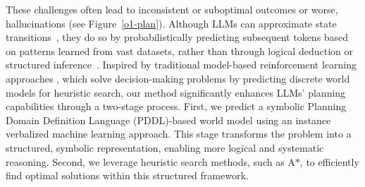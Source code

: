These challenges often lead to inconsistent or suboptimal outcomes or worse, hallucinations (see Figure~\ref{o1-plan}).
Although LLMs can approximate state transitions~\cite{hao2023reasoning}, they do so by probabilistically predicting subsequent tokens based on patterns learned from vast datasets, rather than through logical deduction or structured inference~\cite{kambhampati2024can}.
Inspired by traditional model-based reinforcement learning approaches \cite{agostinellilearning}, which solve decision-making problems by predicting discrete world models for heuristic search, our method significantly enhances LLMs' planning capabilities through a two-stage process. 
First, we predict a symbolic Planning Domain Definition Language (PDDL)-based world model using an instance verbalized machine learning approach. 
This stage transforms the problem into a structured, symbolic representation, enabling more logical and systematic reasoning. Second, we leverage heuristic search methods, such as A$\ast$, to efficiently find optimal solutions within this structured framework.

